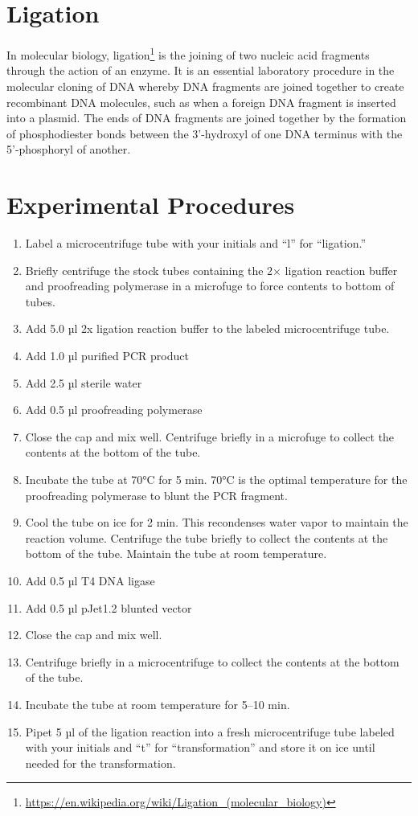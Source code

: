\documentclass[]{book}
\providecommand{\tightlist}{%
  \setlength{\itemsep}{0pt}\setlength{\parskip}{0pt}}
\let\rmarkdownfootnote\footnote%
\def\footnote{\protect\rmarkdownfootnote}
\renewcommand{\href}[2]{#2\footnote{\url{#1}}}
\theoremstyle{definition}
\theoremstyle{definition}
\theoremstyle{definition}
\theoremstyle{remark}
\begin{document}
\section{Ligation}\label{ligation}

In molecular biology,
\href{https://en.wikipedia.org/wiki/Ligation_(molecular_biology)}{ligation}
is the joining of two nucleic acid fragments through the action of an
enzyme. It is an essential laboratory procedure in the molecular cloning
of DNA whereby DNA fragments are joined together to create recombinant
DNA molecules, such as when a foreign DNA fragment is inserted into a
plasmid. The ends of DNA fragments are joined together by the formation
of phosphodiester bonds between the 3'-hydroxyl of one DNA terminus with
the 5'-phosphoryl of another.

\section{Experimental Procedures}\label{experimental-procedures-13}

\begin{enumerate}
\def\labelenumi{\arabic{enumi}.}
\tightlist
\item
  Label a microcentrifuge tube with your initials and ``l'' for
  ``ligation.''
\item
  Briefly centrifuge the stock tubes containing the 2× ligation reaction
  buffer and proofreading polymerase in a microfuge to force contents to
  bottom of tubes.
\item
  Add 5.0 µl 2x ligation reaction buffer to the labeled microcentrifuge
  tube.
\item
  Add 1.0 µl purified PCR product
\item
  Add 2.5 µl sterile water
\item
  Add 0.5 µl proofreading polymerase
\item
  Close the cap and mix well. Centrifuge briefly in a microfuge to
  collect the contents at the bottom of the tube.
\item
  Incubate the tube at 70°C for 5 min. 70°C is the optimal temperature
  for the proofreading polymerase to blunt the PCR fragment.
\item
  Cool the tube on ice for 2 min. This recondenses water vapor to
  maintain the reaction volume. Centrifuge the tube briefly to collect
  the contents at the bottom of the tube. Maintain the tube at room
  temperature.
\item
  Add 0.5 µl T4 DNA ligase
\item
  Add 0.5 µl pJet1.2 blunted vector\\
\item
  Close the cap and mix well.
\item
  Centrifuge briefly in a microcentrifuge to collect the contents at the
  bottom of the tube.
\item
  Incubate the tube at room temperature for 5--10 min.
\item
  Pipet 5 µl of the ligation reaction into a fresh microcentrifuge tube
  labeled with your initials and ``t'' for ``transformation'' and store
  it on ice until needed for the transformation.
\end{enumerate}
\end{document}
